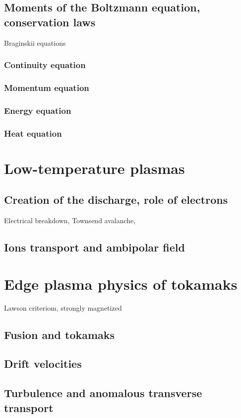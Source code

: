 		\subsection{Moments of the Boltzmann equation, conservation laws}
			Braginskii equations
			\subsubsection{Continuity equation}
			\subsubsection{Momentum equation}
			\subsubsection{Energy equation}
			\subsubsection{Heat equation}
	\section{Low-temperature plasmas}
		\subsection{Creation of the discharge, role of electrons}
		Electrical breakdown, Townsend avalanche, 
		\subsection{Ions transport and ambipolar field}
	\section{Edge plasma physics of tokamaks}
		Lawson criteriom, strongly magnetized
		\subsection{Fusion and tokamaks}
		\subsection{Drift velocities}
		\subsection{Turbulence and anomalous transverse transport}
